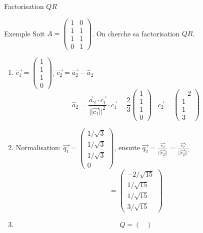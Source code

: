 \begin{parag}{Factorisation $QR$}
    \begin{subparag}{Exemple}
        Soit $A = \begin{pmatrix}
            1 & 0\\ 1 & 1\\
            1 & 1 \\
             0 & 1
        \end{pmatrix}$. On cherche sa factorisation $QR$.
        \\
        \begin{enumerate}
            \item $\vec{c_1} = \begin{pmatrix}
                1  \\ 1 \\ 1 \\ 0
            \end{pmatrix}$, $\vec{c_2} = \vec{a_2} - \hat{a}_2$\\
            \[\hat{a}_2 = \frac{\vec{a}_2\cdot\vec{c_1}}{||\vec{c_1}||^2}\cdot \vec{c_1} = \frac{2}{3}\begin{pmatrix}
                1 \\ 1 \\ 1 \\ 0
            \end{pmatrix} \; \; \; \vec{c_2} = \begin{pmatrix}
                -2 \\ 1 \\ 1 \\ 3
            \end{pmatrix}\]
            \item Normalisation: $\vec{q_1} = \begin{pmatrix}
                1/\sqrt{3}\\
                1/\sqrt{3}\\
                1/\sqrt{3}
                \\
                0
            \end{pmatrix}$, ensuite $\vec{q_2} = \frac{\vec{c_2}}{||\vec{c_2}||} = \frac{\vec{c_2}'}{||\vec{c_2}||'}$
            \[= \begin{pmatrix}
                -2/\sqrt{15}\\
                1/\sqrt{15}\\
                1/\sqrt{15}\\
                3/\sqrt{15}
            \end{pmatrix}\]
        \item \[Q = \begin{pmatrix}

\end{pmatrix}\]
\end{enumerate}
\end{subparag}
\end{parag}
